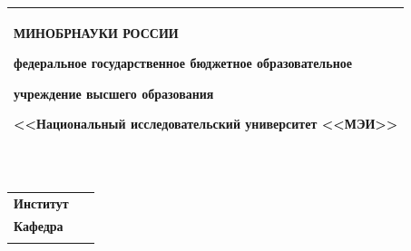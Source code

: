 \makeatletter\newdimen\@tempdimd\makeatother
\setcounter{secnumdepth}{0}


\setlength\tabcolsep{1mm}
\renewcommand\arraystretch{1.3}
\author{Скоробогатов Егор Викторович}
\date{2019-06-05}

\begin{flushleft}
\tablefirsthead{}
\tablehead{}
\tabletail{}
\tablelasttail{}
\begin{supertabular}{m{6.39486in}}
{\centering{} \textbf{МИНОБРНАУКИ РОССИИ}\par}

\begin{center}
\end{center}

{\centering{} федеральное государственное бюджетное образовательное\par}

{\centering{} учреждение высшего образования\par}

{
  \centering 
  \textbf{
    <<Национальный исследовательский университет
    <<МЭИ>>
  }
\par
}

~
\\\hline
\end{supertabular}
\end{flushleft}

\bigskip

\begin{flushleft}
\tablefirsthead{}
\tablehead{}
\tabletail{}
\tablelasttail{}
\begin{supertabular}{m{4.26436in}m{2.0511599in}}
{ \textbf{Институт}} &
~
\\\hhline{~-}
{ \textbf{Кафедра}} &
~
\\\hhline{~-}
\end{supertabular}
\end{flushleft}

